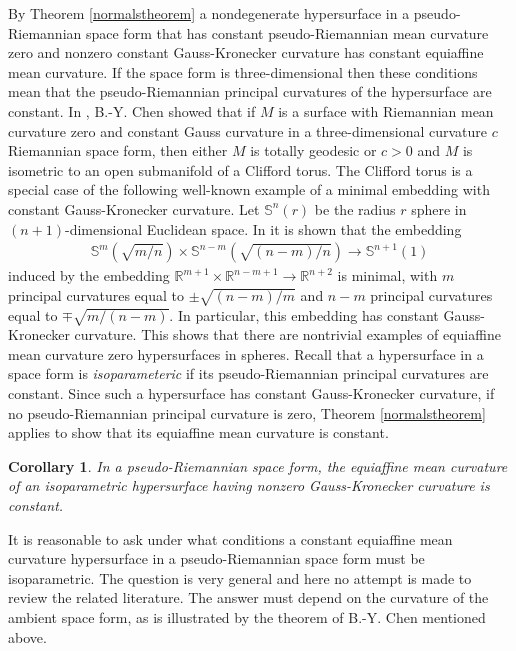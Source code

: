 \documentclass [leqno, 10pt]{amsart}
\newtheorem{corollary}[theorem]{Corollary}
\theoremstyle{definition}
\numberwithin{equation}{section}
\newcommand{\sphere}{\mathbb{S}}
\newcommand{\rea}{\mathbb R}
\begin{document}
By Theorem \ref{normalstheorem} a nondegenerate hypersurface in a pseudo-Riemannian space form that has constant pseudo-Riemannian mean curvature zero and nonzero constant Gauss-Kronecker curvature has constant equiaffine mean curvature. If the space form is three-dimensional then these conditions mean that the pseudo-Riemannian principal curvatures of the hypersurface are constant. In \cite{Chen-minimal}, B.-Y. Chen showed that if $M$ is a surface with Riemannian mean curvature zero and constant Gauss curvature in a three-dimensional curvature $c$ Riemannian space form, then either $M$ is totally geodesic or $c > 0$ and $M$ is isometric to an open submanifold of a Clifford torus. The Clifford torus is a special case of the following well-known example of a minimal embedding with constant Gauss-Kronecker curvature. Let $\sphere^{n}(r)$ be the radius $r$ sphere in $(n+1)$-dimensional Euclidean space. In \cite{Chern-Docarmo-Kobayashi} it is shown that the embedding 
\begin{align}\label{spheresphere}
\sphere^{m}\left(\sqrt{m/n}\right) \times \sphere^{n-m}\left(\sqrt{(n-m)/n}\right) \to \sphere^{n+1}(1)
\end{align} 
induced by the embedding $\rea^{m+1} \times \rea^{n-m+1} \to \rea^{n+2}$ is minimal, with $m$ principal curvatures equal to $\pm \sqrt{(n-m)/m}$ and $n-m$ principal curvatures equal to $\mp\sqrt{m/(n-m)}$. In particular, this embedding has constant Gauss-Kronecker curvature. This shows that there are nontrivial examples of equiaffine mean curvature zero hypersurfaces in spheres. Recall that a hypersurface in a space form is \textit{isoparameteric} if its pseudo-Riemannian principal curvatures are constant. Since such a hypersurface has constant Gauss-Kronecker curvature, if no pseudo-Riemannian principal curvature is zero, Theorem \ref{normalstheorem} applies to show that its equiaffine mean curvature is constant. 
\begin{corollary}
In a pseudo-Riemannian space form, the equiaffine mean curvature of an isoparametric hypersurface having nonzero Gauss-Kronecker curvature is constant.
\end{corollary}
It is reasonable to ask under what conditions a constant equiaffine mean curvature hypersurface in a pseudo-Riemannian space form must be isoparametric. The question is very general and here no attempt is made to review the related literature. The answer must depend on the curvature of the ambient space form, as is illustrated by the theorem of B.-Y. Chen mentioned above. 
\end{document}
